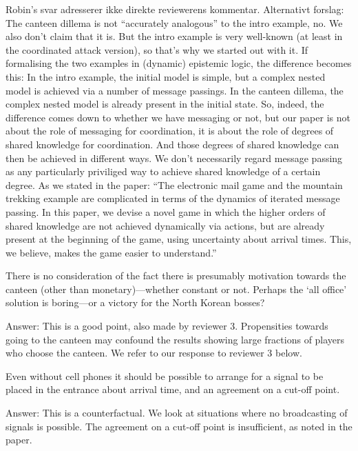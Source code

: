 \documentclass[a4paper]{article}
\newenvironment{robin}{\smallskip \noindent \color{red!10!green!50!blue}}{\color{black}\smallskip}
\newenvironment{tobo}{\smallskip \noindent \color{yellow!80!black!80}}{\color{black}\smallskip}
\begin{document}
\begin{tobo}
Robin's svar adresserer ikke direkte reviewerens kommentar. Alternativt forslag: The canteen dillema is not ``accurately analogous'' to the intro example, no. We also don't claim that it is. But the intro example is very well-known (at least in the coordinated attack version), so that's why we started out with it. If formalising the two examples in (dynamic) epistemic logic, the difference becomes this: In the intro example, the initial model is simple, but a complex nested model is achieved via a number of message passings. In the canteen dillema, the complex nested model is already present in the initial state. So, indeed, the difference comes down to whether we have messaging or not, but our paper is not about the role of messaging for coordination, it is about the role of degrees of shared knowledge for coordination. And those degrees of shared knowledge can then be achieved in different ways. We don't necessarily regard message passing as any particularly priviliged way to achieve shared knowledge of a certain degree. As we stated in the paper: ``The electronic mail game and the mountain trekking example are complicated in terms of the dynamics of iterated message passing. In this paper, we devise a novel game in which the higher orders of shared knowledge are not achieved dynamically via actions, but are already present at the beginning of the game, using uncertainty about arrival times. This, we believe, makes the game easier to understand.'' 
\end{tobo}


There is no consideration of the fact there is presumably motivation towards the canteen (other than monetary)—whether constant or not. Perhaps the `all office' solution is boring—or a victory for the North Korean bosses? 

\begin{robin} Answer: This is a good point, also made by reviewer 3. Propensities towards going to the canteen may confound the results showing large fractions of players who choose the canteen. We refer to our response to reviewer 3 below.
\end{robin}

Even without cell phones it should be possible to arrange for a signal to be placed in the entrance about arrival time, and an agreement on a cut-off point.

\begin{robin} Answer: This is a counterfactual. We look at situations where no broadcasting of signals is possible. The agreement on a cut-off point is insufficient, as noted in the paper.
\end{robin}
\end{document}
